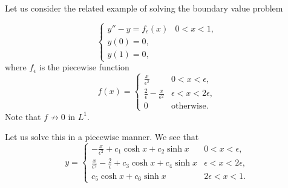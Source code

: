 \begin{example}
Let us consider the related example of solving the boundary value problem

\begin{equation}
\begin{cases}
y'' - y = f_\epsilon(x) & 0 < x < 1,\\
y(0) = 0,\\
y(1) = 0,
\end{cases}
\end{equation}
where $f_\epsilon$ is the piecewise function
\begin{equation}
f(x) = \begin{cases}
\frac{x}{\epsilon^2} & 0 < x < \epsilon,\\
\frac{2}{\epsilon} - \frac{x}{\epsilon^2} & \epsilon< x< 2\epsilon,\\
0 & \text{otherwise}.
\end{cases}
\end{equation}
Note that $f \not \to 0$ in $L^1$.

Let us solve this in a piecewise manner. We see that
\begin{equation}
y = \begin{cases}
-\frac{x}{\epsilon^2} + c_1 \cosh x + c_2 \sinh x & 0<x<\epsilon,\\
\frac{x}{\epsilon^2} - \frac{2}{\epsilon} + c_3 \cosh x + c_4 \sinh x & \epsilon < x < 2\epsilon,\\
c_5 \cosh x + c_6 \sinh x & 2\epsilon < x < 1.
\end{cases}
\end{equation}


\end{example}
